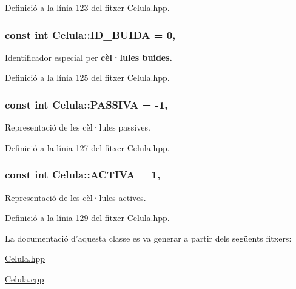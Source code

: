Definició a la línia 123 del fitxer Celula.\-hpp.

\hypertarget{class_celula_a22f5121a6d3cc3cee44274b55ec842e9}{
\subsubsection[{I\-D\-\_\-\-B\-U\-I\-D\-A}]{\setlength{\rightskip}{0pt plus 5cm}const int Celula\-::\-I\-D\-\_\-\-B\-U\-I\-D\-A = 0\hspace{0.3cm}{\ttfamily [static]}, {\ttfamily [private]}}}\label{class_celula_a22f5121a6d3cc3cee44274b55ec842e9}


Identificador especial per {\bfseries cèl·lules buides.} 



Definició a la línia 125 del fitxer Celula.\-hpp.

\hypertarget{class_celula_aea4803f947d114aaea4861232f6f3a38}{
\subsubsection[{P\-A\-S\-S\-I\-V\-A}]{\setlength{\rightskip}{0pt plus 5cm}const int Celula\-::\-P\-A\-S\-S\-I\-V\-A = -\/1\hspace{0.3cm}{\ttfamily [static]}, {\ttfamily [private]}}}\label{class_celula_aea4803f947d114aaea4861232f6f3a38}


Representació de les cèl·lules passives. 



Definició a la línia 127 del fitxer Celula.\-hpp.

\hypertarget{class_celula_a3c06376789ddb1605295cbf3835d01bb}{
\subsubsection[{A\-C\-T\-I\-V\-A}]{\setlength{\rightskip}{0pt plus 5cm}const int Celula\-::\-A\-C\-T\-I\-V\-A = 1\hspace{0.3cm}{\ttfamily [static]}, {\ttfamily [private]}}}\label{class_celula_a3c06376789ddb1605295cbf3835d01bb}


Representació de les cèl·lules actives. 



Definició a la línia 129 del fitxer Celula.\-hpp.



La documentació d'aquesta classe es va generar a partir dels següents fitxers\-:\begin{DoxyCompactItemize}
\item 
\hyperlink{_celula_8hpp}{Celula.\-hpp}\item 
\hyperlink{_celula_8cpp}{Celula.\-cpp}\end{DoxyCompactItemize}
